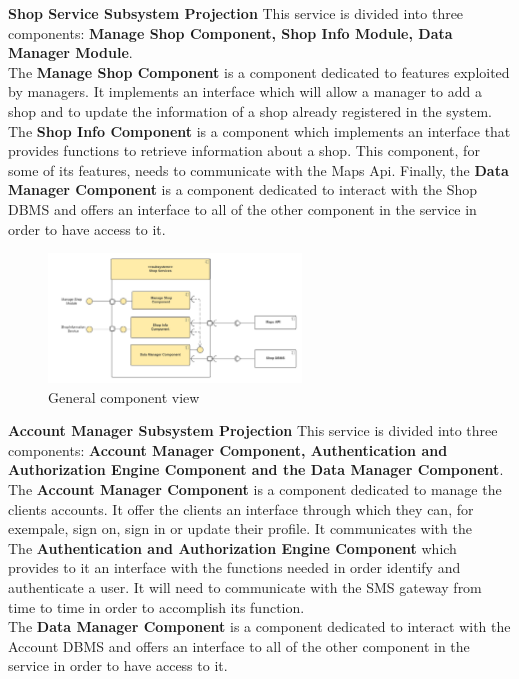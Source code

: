 \textbf{Shop Service Subsystem Projection}
This service is divided into three components: \textbf{Manage Shop Component, Shop Info Module, Data Manager Module}. \\
The \textbf{Manage Shop Component} is a component dedicated to features exploited by managers. It implements an interface which will allow a manager to add a shop and to update the information of a shop already registered in the system.
The \textbf{Shop Info Component} is a component which implements an interface that provides functions to retrieve information about a shop. This component, for some of its features, needs to communicate with the Maps Api.
Finally, the \textbf{Data Manager Component} is a component dedicated to interact with the Shop DBMS and offers an interface to all of the other component in the service in order to have access to it.

\begin{figure}[h!]
    \centering
    \includegraphics[width=0.6\textwidth]{Images/ComponentViewShopServices (1).png}
    \caption{\label{fig:ComponentViewShopServices}{General component view}}
\end{figure}

\textbf{Account Manager Subsystem Projection}
This service is divided into three components: \textbf{Account Manager Component, Authentication and Authorization Engine Component and the Data Manager Component}. \\
The \textbf{Account Manager Component} is a component dedicated to manage the clients accounts. It offer the clients an interface through which they can, for exempale, sign on, sign in or update their profile. It communicates with the\\
The \textbf{Authentication and Authorization Engine Component} which provides to it an interface with the functions needed in order identify and authenticate a user. It will need to communicate with the SMS gateway from time to time in order to accomplish its function.\\
The \textbf{Data Manager Component} is a component dedicated to interact with the Account DBMS and offers an interface to all of the other component in the service in order to have access to it. 

